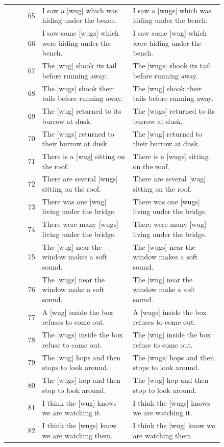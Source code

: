 \begin{table}[p]
\begin{tabular}{@{}rp{0.42\linewidth}p{0.42\linewidth}@{}}
65 & I saw a {[}wug{]} which was hiding under the bench. & I saw a {[}wugs{]} which was hiding under the bench. \\
66 & I saw some {[}wugs{]} which were hiding under the bench. & I saw some {[}wug{]} which were hiding under the bench. \\
67 & The {[}wug{]} shook its tail before running away. & The {[}wugs{]} shook its tail before running away. \\
68 & The {[}wugs{]} shook their tails before running away. & The {[}wug{]} shook their tails before running away. \\
69 & The {[}wug{]} returned to its burrow at dusk. & The {[}wugs{]} returned to its burrow at dusk. \\
70 & The {[}wugs{]} returned to their burrow at dusk. & The {[}wug{]} returned to their burrow at dusk. \\
71 & There is a {[}wug{]} sitting on the roof. & There is a {[}wugs{]} sitting on the roof. \\
72 & There are several {[}wugs{]} sitting on the roof. & There are several {[}wug{]} sitting on the roof. \\
73 & There was one {[}wug{]} living under the bridge. & There was one {[}wugs{]} living under the bridge. \\
74 & There were many {[}wugs{]} living under the bridge. & There were many {[}wug{]} living under the bridge. \\
75 & The {[}wug{]} near the window makes a soft sound. & The {[}wugs{]} near the window makes a soft sound. \\
76 & The {[}wugs{]} near the window make a soft sound. & The {[}wug{]} near the window make a soft sound. \\
77 & A {[}wug{]} inside the box refuses to come out. & A {[}wugs{]} inside the box refuses to come out. \\
78 & The {[}wugs{]} inside the box refuse to come out. & The {[}wug{]} inside the box refuse to come out. \\
79 & The {[}wug{]} hops and then stops to look around. & The {[}wugs{]} hops and then stops to look around. \\
80 & The {[}wugs{]} hop and then stop to look around. & The {[}wug{]} hop and then stop to look around. \\
81 & I think the {[}wug{]} knows we are watching it. & I think the {[}wugs{]} knows we are watching it. \\
82 & I think the {[}wugs{]} know we are watching them. & I think the {[}wug{]} know we are watching them. \\

\end{tabular}
\end{table}
